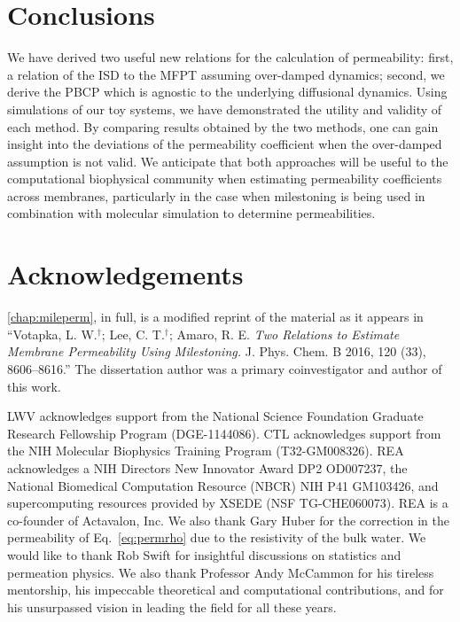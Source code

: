 \section{Conclusions}
    \par We have derived two useful new relations for the calculation of permeability: first, a relation of the ISD to the MFPT assuming over-damped dynamics; second, we derive the PBCP which is agnostic to the underlying diffusional dynamics. Using simulations of our toy systems, we have demonstrated the utility and validity of each method. By comparing results obtained by the two methods, one can gain insight into the deviations of the permeability coefficient when the over-damped assumption is not valid. We anticipate that both approaches will be useful to the computational biophysical community when estimating permeability coefficients across membranes, particularly in the case when milestoning is being used in combination with molecular simulation to determine permeabilities.

\section{Acknowledgements}
    \par \cref{chap:mileperm}, in full, is a modified reprint of the material as it appears in ``Votapka, L. W.$^{\dagger}$; Lee, C. T.$^{\dagger}$; Amaro, R. E. \emph{Two Relations to Estimate Membrane Permeability Using Milestoning.} J. Phys. Chem. B 2016, 120 (33), 8606–8616.''
    The dissertation author was a primary coinvestigator and author of this work.

    \par LWV acknowledges support from the National Science Foundation Graduate Research Fellowship Program (DGE-1144086). CTL acknowledges support from the NIH Molecular Biophysics Training Program (T32-GM008326). REA acknowledges a NIH Directors New Innovator Award DP2 OD007237, the National Biomedical Computation Resource (NBCR) NIH P41 GM103426, and supercomputing resources provided by XSEDE (NSF TG-CHE060073). REA is a co-founder of Actavalon, Inc. We also thank Gary Huber for the correction in the permeability of Eq.~\ref{eq:permrho} due to the resistivity of the bulk water. We would like to thank Rob Swift for insightful discussions on statistics and permeation physics. We also thank Professor Andy McCammon for his tireless mentorship, his impeccable theoretical and computational contributions, and for his unsurpassed vision in leading the field for all these years.
